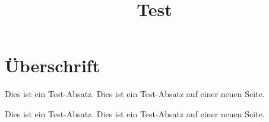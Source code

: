 \documentclass[twoside,titlepage]{article}
\begin{document}
  \title{Test}
  \maketitle
  \newpage
  \setcounter{page}{1}

  \section{Überschrift}
  Dies ist ein Test-Absatz. \newpage
  Dies ist ein Test-Absatz auf einer neuen Seite. \newpage

  Dies ist ein Test-Absatz. \newpage
  Dies ist ein Test-Absatz auf einer neuen Seite.
\end{document}

